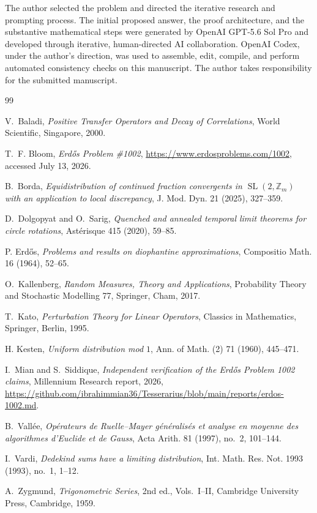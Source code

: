 \documentclass[11pt,a4paper]{amsart}
\theoremstyle{definition}
\theoremstyle{remark}
\begin{document}
The author selected the problem and directed the iterative research and
prompting process.  The initial proposed answer, the proof architecture, and
the substantive mathematical steps were generated by OpenAI GPT-5.6 Sol Pro
and developed through iterative, human-directed AI collaboration.  OpenAI
Codex, under the author's direction, was used to assemble, edit, compile, and
perform automated consistency checks on this manuscript.  The author takes
responsibility for the submitted manuscript.

\begin{thebibliography}{99}

V.~Baladi,
\emph{Positive Transfer Operators and Decay of Correlations},
World Scientific, Singapore, 2000.

T.~F. Bloom,
\emph{Erd\H{o}s Problem \#1002},
\url{https://www.erdosproblems.com/1002}, accessed July 13, 2026.

B.~Borda,
\emph{Equidistribution of continued fraction convergents in
$\operatorname{SL}(2,\mathbb Z_m)$ with an application to local discrepancy},
J. Mod. Dyn. 21 (2025), 327--359.

D.~Dolgopyat and O.~Sarig,
\emph{Quenched and annealed temporal limit theorems for circle rotations},
Ast\'erisque 415 (2020), 59--85.

P. Erd\H{o}s,
\emph{Problems and results on diophantine approximations},
Compositio Math. 16 (1964), 52--65.

O.~Kallenberg,
\emph{Random Measures, Theory and Applications},
Probability Theory and Stochastic Modelling 77,
Springer, Cham, 2017.

T.~Kato,
\emph{Perturbation Theory for Linear Operators},
Classics in Mathematics, Springer, Berlin, 1995.

H. Kesten,
\emph{Uniform distribution mod $1$},
Ann. of Math. (2) 71 (1960), 445--471.

I.~Mian and S.~Siddique,
\emph{Independent verification of the Erd\H{o}s Problem 1002 claims},
Millennium Research report, 2026,
\url{https://github.com/ibrahimmian36/Tesserarius/blob/main/reports/erdos-1002.md}.

B.~Vall\'ee,
\emph{Op\'erateurs de Ruelle--Mayer g\'en\'eralis\'es et analyse en moyenne
des algorithmes d'Euclide et de Gauss},
Acta Arith. 81 (1997), no.~2, 101--144.

I.~Vardi,
\emph{Dedekind sums have a limiting distribution},
Int. Math. Res. Not. 1993 (1993), no.~1, 1--12.

A.~Zygmund,
\emph{Trigonometric Series}, 2nd ed., Vols.~I--II,
Cambridge University Press, Cambridge, 1959.

\end{thebibliography}
\end{document}
